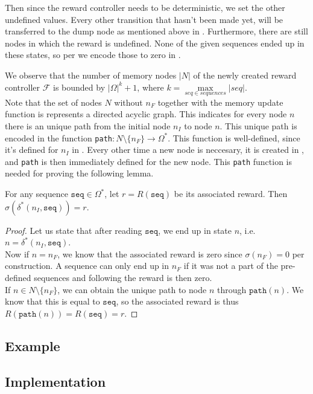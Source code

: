 Then since the reward controller needs to be deterministic, we set the other undefined values. Every other transition that hasn't been made yet, will be transferred to the dump node as mentioned above in . Furthermore, there are still nodes in which the reward is undefined. None of the given sequences ended up in these states, so per  we encode those to zero in .

We observe that the number of memory nodes $|N|$ of the newly created reward controller $\mathcal{F}$ is bounded by $|\Omega|^k + 1$, where $k=\max\limits_{seq\in sequences} |seq|$.\\

Note that the set of nodes $N$ without $n_F$ together with the memory update function is represents a directed acyclic graph. This indicates for every node $n$ there is an unique path from the initial node $n_I$ to node $n$. This unique path is encoded in the function \texttt{path}$:N\setminus\{n_F\}\to\Omega^*$. This function is well-defined, since it's defined for $n_I$ in . Every other time a new node is neccesary, it is created in , and \texttt{path} is then immediately defined for the new node. This \texttt{path} function is needed for proving the following lemma. 


\begin{lemma}
For any sequence $\texttt{seq}\in\Omega^*$, let $r=R(\texttt{seq})$ be its associated reward. Then $\sigma(\delta^*(n_I,\texttt{seq}))=r$.
\begin{proof}
Let us state that after reading $\texttt{seq}$, we end up in state $n$, i.e. $n = \delta^*(n_I,\texttt{seq})$. \\
Now if $n=n_F$, we know that the associated reward is zero since $\sigma(n_F)=0$ per construction. A sequence can only end up in $n_F$ if it was not a part of the pre-defined sequences and following  the reward is then zero. \\
If $n\in N\setminus \{n_F\}$, we can obtain the unique path to node $n$ through $\texttt{path}(n)$. We know that this is equal to $\texttt{seq}$, so the associated reward is thus $R(\texttt{path}(n))=R(\texttt{seq})=r$.
\end{proof}
\label{lem:proof_seq}
\end{lemma}

\subsection*{Example}


\subsection*{Implementation}
